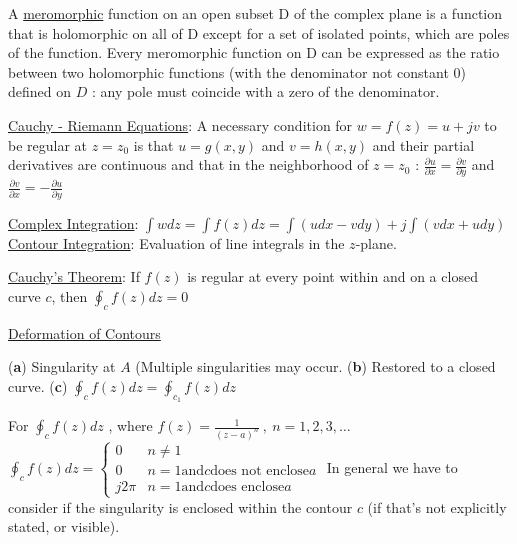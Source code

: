 \documentclass[12pt]{article}
\begin{document}
\begin{flushleft}
	\textbullet \quad A \uline{meromorphic} function on an open subset D of the complex plane is a function that is holomorphic on all of D except for a set of isolated points, which are poles of the function. Every meromorphic function on D can be expressed as the ratio between two holomorphic functions (with the denominator not constant $0$) defined on $D$  :  any pole must coincide with a zero of the denominator. \linebreak 
	
	\textbullet \quad \uline{Cauchy - Riemann Equations}: A necessary condition for $w=f(z) = u+jv$ to be regular at $z=z_0$ is that $u=g(x,y)$ and $v=h(x,y)$ and their partial derivatives are continuous and that in the neighborhood of $z=z_0$  :  \linebreak 
	$\displaystyle \frac{\partial u}{\partial x} = \frac{\partial v}{\partial y} $ and $\frac{\partial v}{\partial x} = - \frac{\partial u}{\partial y}$ \linebreak 
	
	\textbullet \quad \uline{Complex Integration}: $\displaystyle \int wdz = \int f(z) dz = \int \left( udx -vdy \right) + j \int \left( vdx + udy \right) $ \linebreak 
	\textbullet \quad \uline{Contour Integration}: Evaluation of line integrals in the $z$-plane. 
	
	\textbullet \quad \uline{Cauchy's Theorem}: If $f(z)$ is regular at every point within and on a closed curve $c$, then \linebreak 
	$\displaystyle \oint_c f(z) dz = 0$ \linebreak 
	
	\textbullet \quad \uline{Deformation of Contours} \linebreak 

	(\textbf{a}) Singularity at $A$ (Multiple singularities may occur. \linebreak 
	(\textbf{b}) Restored to a closed curve. \linebreak 
	(\textbf{c}) $\displaystyle \oint_c f(z) dz = \oint_{c_1} f(z) dz$ \linebreak 
	
	For $\displaystyle \oint_c f(z) dz$ , where $\displaystyle f(z) = \frac{1}{(z-a)^n} \ , \ n = 1,2,3,\ldots $ \linebreak 
	$ \displaystyle \oint_c f(z) dz = 
		\begin{cases}		
			0 & n \neq 1 \\ 
			0 & n = 1 \text{and} c \text{does not enclose} a \\ 
			j2\pi & n=1 \text{and} c \text{does enclose} a		
		\end{cases} $ 	
	In general we have to consider if the singularity is enclosed within the contour $c$ (if that's not explicitly stated, or visible). \linebreak 
	

\end{flushleft}
\end{document}
